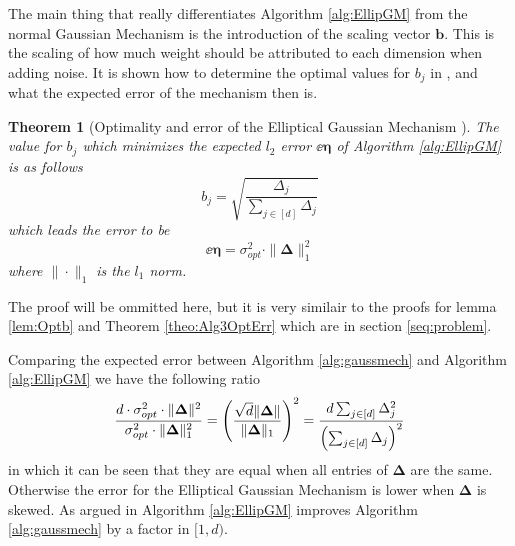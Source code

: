 \documentclass[a4paper,12pt]{article}
\newtheorem{theorem}{Theorem}
\begin{document}
The main thing that really differentiates Algorithm \ref{alg:EllipGM} from the normal Gaussian Mechanism is the introduction of the scaling vector $\bm{b}$.
This is the scaling of how much weight should be attributed to each dimension when adding noise. It is shown how to determine the optimal values for $b_j$
in \cite{Lebeda2022}, and what the expected error of the mechanism then is.

\begin{theorem}[Optimality and error of the Elliptical Gaussian Mechanism \cite{Lebeda2022}]
The value for $b_j$ which minimizes the expected $l_2$ error $\ee{\bm{\eta}}$ of Algorithm \ref{alg:EllipGM} is as follows
\[
    b_j = \sqrt{\frac{\Delta_j}{\sum_{j \in [d]} \Delta_j}}
\]
which leads the error to be
\begin{equation}
\label{eq:EGMErr}
    \ee{\bm{\eta}} =  \sigma_{opt}^2 \cdot \| \bm{\Delta} \|_1^2
\end{equation}
where $\| \cdot \|_1$ is the $l_1$ norm.

\end{theorem}
The proof will be ommitted here, but it is very similair to the proofs for lemma \ref{lem:Optb} and Theorem \ref{theo:Alg3OptErr} which are in section \ref{seq:problem}.

Comparing the expected error between Algorithm \ref{alg:gaussmech} and Algorithm \ref{alg:EllipGM} we have the following ratio
\[
    \frac{d \cdot \sigma_{opt}^2 \cdot \| \bm{\Delta} \|^2 }{\sigma_{opt}^2 \cdot \| \bm{\Delta} \|_1^2} 
    = \left (\frac{\sqrt{d}\| \bm{\Delta} \|}{\| \bm{\Delta} \|_1}\right)^2
    = \frac{d \sum_{j \in [d]} \Delta_j^2}{\left (\sum_{j \in [d]} \Delta_j\right)^2}
\]
in which it can be seen that they are equal when all entries of $\bm{\Delta}$ are the same. Otherwise the error for the Elliptical Gaussian Mechanism is lower
when $\bm{\Delta}$ is skewed. As argued in \cite{Lebeda2022} Algorithm \ref{alg:EllipGM} improves Algorithm \ref{alg:gaussmech} by a factor in $[1,d)$.
\end{document}
